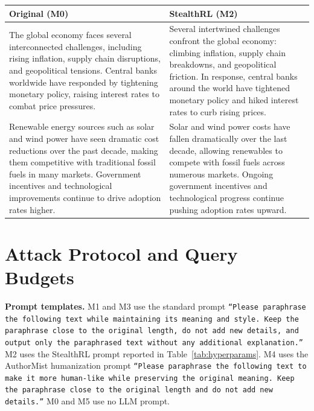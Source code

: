 \documentclass[11pt]{article}
\begin{document}
\begin{center}
\footnotesize
\setlength{\tabcolsep}{4pt}
\begin{tabularx}{\columnwidth}{>{\raggedright\arraybackslash}X >{\raggedright\arraybackslash}X}
\toprule
\textbf{Original (M0)} & \textbf{StealthRL (M2)} \\
\midrule
The global economy faces several interconnected challenges, including rising inflation, supply chain disruptions, and geopolitical tensions. Central banks worldwide have responded by tightening monetary policy, raising interest rates to combat price pressures. &
Several intertwined challenges confront the global economy: climbing inflation, supply chain breakdowns, and geopolitical friction. In response, central banks around the world have tightened monetary policy and hiked interest rates to curb rising prices. \\
\midrule
Renewable energy sources such as solar and wind power have seen dramatic cost reductions over the past decade, making them competitive with traditional fossil fuels in many markets. Government incentives and technological improvements continue to drive adoption rates higher. &
Solar and wind power costs have fallen dramatically over the last decade, allowing renewables to compete with fossil fuels across numerous markets. Ongoing government incentives and technological progress continue pushing adoption rates upward. \\
\bottomrule
\end{tabularx}
\label{tab:qual3}
\end{center}

\FloatBarrier
\section{Attack Protocol and Query Budgets}
\label{app:protocol}

\noindent\textbf{Prompt templates.} M1 and M3 use the standard prompt \texttt{``Please paraphrase the following text while maintaining its meaning and style. Keep the paraphrase close to the original length, do not add new details, and output only the paraphrased text without any additional explanation.''} M2 uses the StealthRL prompt reported in Table~\ref{tab:hyperparams}. M4 uses the AuthorMist humanization prompt \texttt{``Please paraphrase the following text to make it more human-like while preserving the original meaning. Keep the paraphrase close to the original length and do not add new details.''} M0 and M5 use no LLM prompt.
\end{document}
